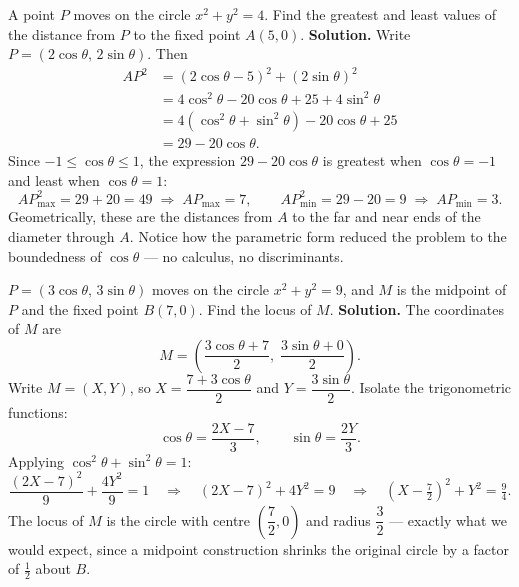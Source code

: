 \documentclass[11pt]{article}
\begin{document}
\begin{exoresolu}
A point $P$ moves on the circle $x^{2}+y^{2}=4$. Find the greatest and least values of the distance from $P$ to the fixed point $A(5,0)$.
\tcblower
\textbf{Solution.} Write $P=(2\cos\theta,\,2\sin\theta)$. Then
\begin{align*}
AP^{2}&=(2\cos\theta-5)^{2}+(2\sin\theta)^{2}\\
&=4\cos^{2}\theta-20\cos\theta+25+4\sin^{2}\theta\\
&=4(\cos^{2}\theta+\sin^{2}\theta)-20\cos\theta+25\\
&=29-20\cos\theta.
\end{align*}
Since $-1\leq\cos\theta\leq1$, the expression $29-20\cos\theta$ is greatest when $\cos\theta=-1$ and least when $\cos\theta=1$:
\[
AP^{2}_{\max}=29+20=49 \;\Rightarrow\; AP_{\max}=7, \qquad
AP^{2}_{\min}=29-20=9 \;\Rightarrow\; AP_{\min}=3.
\]
Geometrically, these are the distances from $A$ to the far and near ends of the diameter through $A$. Notice how the parametric form reduced the problem to the boundedness of $\cos\theta$ — no calculus, no discriminants.
\end{exoresolu}

\begin{exoresolu}
$P=(3\cos\theta,\,3\sin\theta)$ moves on the circle $x^{2}+y^{2}=9$, and $M$ is the midpoint of $P$ and the fixed point $B(7,0)$. Find the locus of $M$.
\tcblower
\textbf{Solution.} The coordinates of $M$ are
\[
M=\left(\frac{3\cos\theta+7}{2},\; \frac{3\sin\theta+0}{2}\right).
\]
Write $M=(X,Y)$, so $X=\dfrac{7+3\cos\theta}{2}$ and $Y=\dfrac{3\sin\theta}{2}$. Isolate the trigonometric functions:
\[
\cos\theta=\frac{2X-7}{3}, \qquad \sin\theta=\frac{2Y}{3}.
\]
Applying $\cos^{2}\theta+\sin^{2}\theta=1$:
\[
\frac{(2X-7)^{2}}{9}+\frac{4Y^{2}}{9}=1
\quad\Longrightarrow\quad
(2X-7)^{2}+4Y^{2}=9
\quad\Longrightarrow\quad
\left(X-\tfrac{7}{2}\right)^{2}+Y^{2}=\tfrac{9}{4}.
\]
The locus of $M$ is the circle with centre $\left(\dfrac{7}{2},0\right)$ and radius $\dfrac{3}{2}$ — exactly what we would expect, since a midpoint construction shrinks the original circle by a factor of $\tfrac{1}{2}$ about $B$.
\end{exoresolu}
\end{document}
